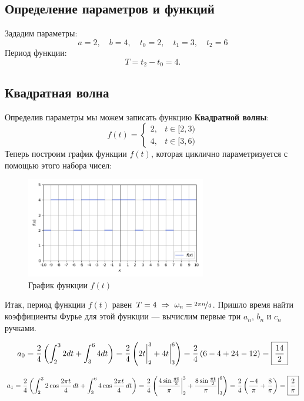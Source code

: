 \documentclass[a4paper]{article}
\newcommand*\msquared[1]{\tikz[baseline=(char.base)]{
            \node[shape=rectangle,draw,inner sep=4pt] (char) {$\displaystyle #1$};}}
\newcommand{\at}{\biggr\rvert}
\begin{document}
\subsection{Определение параметров и функций}

Зададим параметры:
\[ a = 2, \quad b = 4, \quad t_0 = 2, \quad t_1 = 3, \quad t_2 = 6 \]
Период функции:
\[ T = t_2 - t_0 = 4. \]

\subsection{Квадратная волна}
Определив параметры мы можем записать функцию \textbf{Квадратной волны}:
$$f(t) = \begin{cases} 
    2, & t \in [2, 3) \\
    4, & t \in [3, 6) 
    \end{cases}$$
Теперь построим график функции $f(t)$, которая циклично параметризуется с помощью этого набора чисел:
\begin{figure}[H]
    \centering 
    \includegraphics[width=0.7\textwidth]{square_wave/func.png}
    \caption{График функции $f(t)$}
\end{figure}

Итак, период функции $f(t)$ равен $T = 4 \ \Rightarrow\  \omega_n = \nicefrac{2\pi n}{4}$. Пришло время найти коэффициенты Фурье для этой функции --- вычислим первые три $a_n$, $b_n$ и $c_n$ ручками.

$$a_0 = \frac{2}{4} \left( \int_{2}^{3} 2 dt + \int_{3}^{6} 4 dt \right) = \frac{2}{4}\left( 2t\at^3_2 + 4t\at^6_3 \right) = \frac{2}{4}\left( 6 - 4 + 24 - 12 \right) = \msquared{\frac{14}{2}}$$

$$a_1 = \frac{2}{4}\left( \int_{2}^{3} 2\cos\frac{2\pi t}{4}\,dt + \int_{3}^{6} 4\cos\frac{2\pi t}{4}\,dt \right) = \frac{2}{4}\left( \frac{4\sin \frac{\pi t}{2}}{\pi}\at^3_2 + \frac{8\sin\frac{\pi t}{2}}{\pi}\at^6_3\right) = \frac{2}{4}\left(\frac{-4}{\pi} +\frac{8}{\pi} \right) = \msquared{\frac{2}{\pi}}$$
\end{document}
